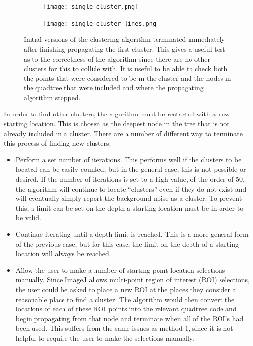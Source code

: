 \begin{figure}[tbh]
	\centering
	\begin{subfigure}[c]{4.2cm}
		\texttt{[image: single-cluster.png]}
		\caption{}\label{fig:single-cluster-points}
	\end{subfigure}%
	\quad
	\begin{subfigure}[c]{4.2cm}
		\texttt{[image: single-cluster-lines.png]}
		\caption{}\label{fig:single-cluster-lines}
	\end{subfigure}

	\caption[Propagation of a single starting location.]{Initial versions of
		the clustering algorithm terminated immediately after finishing
		propagating the first cluster. This gives a useful test as to the
		correctness of the algorithm since there are no other clusters for this
		to collide with. It is useful to be able to check both
		 the points that were considered to
		be in the cluster and  the nodes in
		the quadtree that were included and where the propagating algorithm
		stopped.}\label{fig:single-cluster}
\end{figure}

In order to find other clusters, the algorithm must be restarted with a new
starting location. This is chosen as the deepest node in the tree that is not
already included in a cluster. There are a number of different way to terminate
this process of finding new clusters:

\begin{itemize}

	\item Perform a set number of iterations. This performs well if the
		clusters to be located can be easily counted, but in the general case,
		this is not possible or desired. If the number of iterations is set to
		a high value, of the order of 50, the algorithm will continue to locate
		``clusters'' even if they do not exist and will eventually simply
		report the background noise as a cluster. To prevent this, a limit can
		be set on the depth a starting location must be in order to be valid.

	\item Continue iterating until a depth limit is reached. This is a more
		general form of the previous case, but for this case, the limit on the
		depth of a starting location will always be reached.

	\item Allow the user to make a number of starting point location selections
		manually. Since ImageJ allows multi-point region of interest (ROI)
		selections, the user could be asked to place a new ROI at the places
		they consider a reasonable place to find a cluster. The algorithm would
		then convert the locations of each of these ROI points into the
		relevant quadtree code and begin propagating from that node and
		terminate when all of the ROI's had been used. This suffers from the
		same issues as method 1, since it is not helpful to require the user to
		make the selections manually.

\end{itemize}

